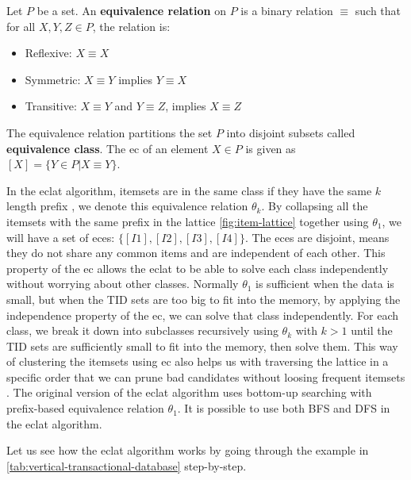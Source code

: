 \begin{definition}
    Let $P$ be a set. An \textbf{equivalence relation} on $P$ is a binary relation $\equiv$ such that for all $X, Y, Z \in P$, the relation is:
    \begin{itemize}
        \item Reflexive: $X \equiv X$
        \item Symmetric: $X \equiv Y$ implies $Y \equiv X$
        \item Transitive: $X \equiv Y$ and $Y \equiv Z$, implies $X \equiv Z$
    \end{itemize}
    The equivalence relation partitions the set $P$ into disjoint subsets called \textbf{equivalence class}. The \ac{ec} of an element $X \in P$ is given as $[X] = \{ Y \in P | X \equiv Y \}$.
\end{definition}


In the \ac{eclat} algorithm, itemsets are in the same class if they have the same $k$ length prefix \citep{zaki2000}, we denote this equivalence relation $\theta_k$.
By collapsing all the itemsets with the same prefix in the lattice \autoref{fig:item-lattice} together using $\theta_1$, we will have a set of \ac{ec}es: $\{[I1], [I2], [I3], [I4]\}$.
The \ac{ec}es are disjoint, means they do not share any common items and are independent of each other. %
This property of the \ac{ec} allows the \ac{eclat} to be able to solve each class independently without worrying about other classes.
Normally $\theta_1$ is sufficient when the data is small, but when the TID sets are too big to fit into the memory, by applying the independence property of the \ac{ec}, we can solve that class independently.
For each class, we break it down into subclasses recursively using $\theta_k$ with $k>1$ until the TID sets are sufficiently small to fit into the memory, then solve them.
This way of clustering the itemsets using \ac{ec} also helps us with traversing the lattice in a specific order that we can prune bad candidates without loosing frequent itemsets \citep{zaki2000}.
The original version of the \ac{eclat} algorithm uses bottom-up searching with prefix-based equivalence relation $\theta_1$.
It is possible to use both \ac{BFS} and \ac{DFS} in the \ac{eclat} algorithm.

Let us see how the \ac{eclat} algorithm works by going through the example in \autoref{tab:vertical-transactional-database} step-by-step.

